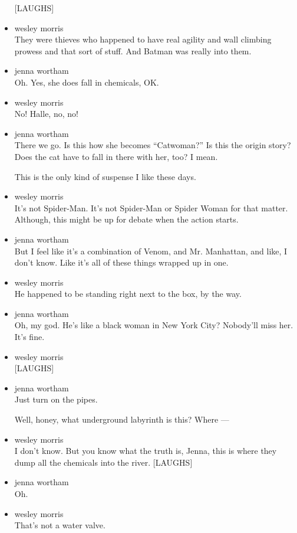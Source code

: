 \begin{itemize}
  {[}LAUGHS{]}
\item
  wesley morris\\
  They were thieves who happened to have real agility and wall climbing
  prowess and that sort of stuff. And Batman was really into them.
\item
  jenna wortham\\
  Oh. Yes, she does fall in chemicals, OK.
\item
  wesley morris\\
  No! Halle, no, no!
\item
  jenna wortham\\
  There we go. Is this how she becomes ``Catwoman?'' Is this the origin
  story? Does the cat have to fall in there with her, too? I mean.

  This is the only kind of suspense I like these days.
\item
  wesley morris\\
  It's not Spider-Man. It's not Spider-Man or Spider Woman for that
  matter. Although, this might be up for debate when the action starts.
\item
  jenna wortham\\
  But I feel like it's a combination of Venom, and Mr. Manhattan, and
  like, I don't know. Like it's all of these things wrapped up in one.
\item
  wesley morris\\
  He happened to be standing right next to the box, by the way.
\item
  jenna wortham\\
  Oh, my god. He's like a black woman in New York City? Nobody'll miss
  her. It's fine.
\item
  wesley morris\\
  {[}LAUGHS{]}
\item
  jenna wortham\\
  Just turn on the pipes.

  Well, honey, what underground labyrinth is this? Where ---
\item
  wesley morris\\
  I don't know. But you know what the truth is, Jenna, this is where
  they dump all the chemicals into the river. {[}LAUGHS{]}
\item
  jenna wortham\\
  Oh.
\item
  wesley morris\\
  That's not a water valve.


\end{itemize}
